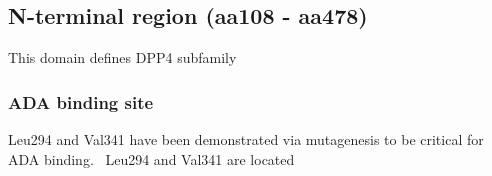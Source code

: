 \subsection{N-terminal region (aa108 - aa478)}

This domain defines DPP4 subfamily

\subsubsection{ADA binding site}
Leu294 and Val341 have been demonstrated via mutagenesis to be critical for ADA binding.~\cite{Abbott_1999} Leu294 and Val341 are located